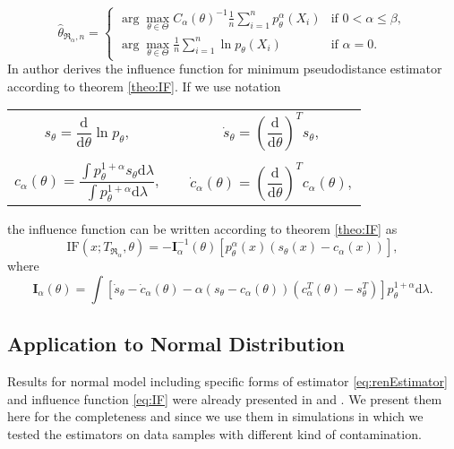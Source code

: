 \begin{equation}
	\hat{\theta}_{\mathfrak{R}_\alpha,n} =
	\begin{cases}
		\displaystyle{ \arg \max_{\theta \in \Theta} C_\alpha\left( \theta \right)^{-1} \frac{1}{n} \sum_{i=1}^n p_{\theta}^{\alpha}\left( X_i \right) } & \text{if } 0 < \alpha \leq \beta, \\
		\displaystyle{ \arg \max_{\theta \in \Theta}  \frac{1}{n} \sum_{i=1}^n \ln p_{\theta}\left( X_i \right) } & \text{if } \alpha = 0.
	\end{cases}	
	\label{eq:renEstimator}
\end{equation}
In \cite{Vajda2009} author derives the influence function for minimum \ren pseudodistance estimator according to theorem \ref{theo:IF}. If we use notation 
\begin{center}
	\begin{tabular}{c c}
	$s_\theta = \dfrac{\mathrm{d}}{\mathrm{d}\theta} \ln p_\theta, \quad$ & $ \dot{s}_\theta = \left( \dfrac{\mathrm{d}}{\mathrm{d}\theta} \right)^T s_\theta,$ \\ 
	&\\
	$c_\alpha(\theta) = \dfrac{\int p_\theta^{1+\alpha}s_\theta \mathrm{d}\lambda}{\int p_\theta^{1+\alpha} \mathrm{d}\lambda}, \quad$ & $\dot{c}_\alpha(\theta)= \left( \dfrac{\mathrm{d}}{\mathrm{d}\theta} \right)^T c_\alpha(\theta),$  \\ 
	\end{tabular} 
\end{center}
the influence function can be written according to theorem \ref{theo:IF} as
\begin{equation}
	\mathrm{IF}(x;T_{\mathfrak{R}_\alpha},\theta) = -\mathbf{I}^{-1}_{\alpha}(\theta) \left[ p_\theta^\alpha(x) (s_\theta (x) - c_\alpha (x)) \right], 
	\label{eq:IF}
\end{equation}
where 
\begin{equation}
\mathbf{I}_{\alpha}(\theta) = \int{ \left[\dot{s}_\theta - \dot{c}_\alpha(\theta) - \alpha(s_\theta - c_\alpha(\theta))(c^T_\alpha(\theta) - s^T_\theta) \right] p_\theta^{1+\alpha} \mathrm{d}\lambda}.
\end{equation}

\subsection{Application to Normal Distribution}

Results for normal model including specific forms of estimator \eqref{eq:renEstimator} and influence function \eqref{eq:IF} were already presented in \cite{Vajda2009} and \cite{Demut2010}. We present them here for the completeness and since we use them in simulations in which we tested the estimators on data samples with different kind of contamination.

